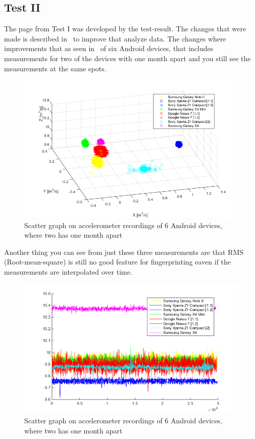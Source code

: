 \subsection{Test II}
The page from Test I was developed by the test-result. The changes that were made is described in~ to improve that analyze data. The changes where improvements that as seen in~ of six Android devices, that includes measurements for two of the devices with one month apart and you still see the measurements at the same spots.
\begin{figure}[H]
	\centering
	\includegraphics[scale=.7]{img/oneMonth-scatter}
	\caption{Scatter graph on accelerometer recordings of 6 Android devices, where two has one month apart}
	\label{fig:scatter1m}
\end{figure}
Another thing you can see from just these three measurements are that RMS (Root-mean-square) is still no good feature for fingerprinting eaven if the measurements are interpolated over time.
\begin{figure}[H]
	\centering
	\includegraphics[scale=.7]{img/oneMonth-plot-RMS}
	\caption{Scatter graph on accelerometer recordings of 6 Android devices, where two has one month apart}
	\label{fig:plot1mRMS}
\end{figure}

